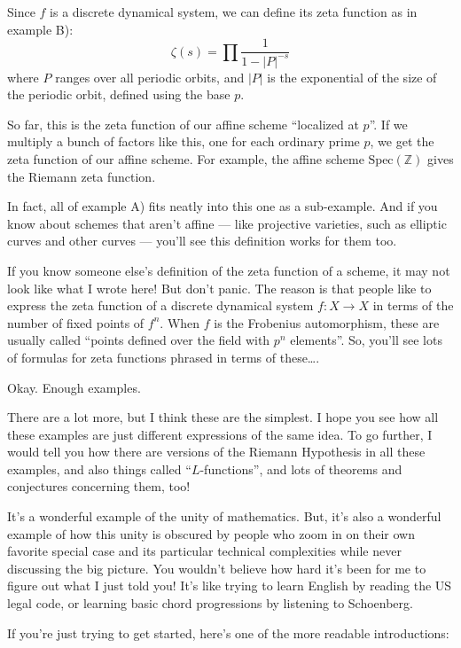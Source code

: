 \documentclass{article}
\def\tightlist{}
\renewcommand{\texttt}[1]{%
  \begingroup
  \ttfamily
  \begingroup\lccode`~=`/\lowercase{\endgroup\def~}{/\discretionary{}{}{}}%
  \begingroup\lccode`~=`[\lowercase{\endgroup\def~}{[\discretionary{}{}{}}%
  \begingroup\lccode`~=`.\lowercase{\endgroup\def~}{.\discretionary{}{}{}}%
  \catcode`/=\active\catcode`[=\active\catcode`.=\active
  \scantokens{#1\noexpand}%
  \endgroup
}
\begin{document}
Since \(f\) is a discrete dynamical system, we can define its zeta
function as in example B): \[\zeta(s) = \prod \frac{1}{1 - |P|^{-s}}\]
where \(P\) ranges over all periodic orbits, and \(|P|\) is the
exponential of the size of the periodic orbit, defined using the base
\(p\).

So far, this is the zeta function of our affine scheme ``localized at
\(p\)''. If we multiply a bunch of factors like this, one for each
ordinary prime \(p\), we get the zeta function of our affine scheme. For
example, the affine scheme \(\mathrm{Spec}(\mathbb{Z})\) gives the
Riemann zeta function.

In fact, all of example A) fits neatly into this one as a sub-example.
And if you know about schemes that aren't affine --- like projective
varieties, such as elliptic curves and other curves --- you'll see this
definition works for them too.

If you know someone else's definition of the zeta function of a scheme,
it may not look like what I wrote here! But don't panic. The reason is
that people like to express the zeta function of a discrete dynamical
system \(f\colon X \to X\) in terms of the number of fixed points of
\(f^n\). When \(f\) is the Frobenius automorphism, these are usually
called ``points defined over the field with \(p^n\) elements''. So,
you'll see lots of formulas for zeta functions phrased in terms of
these\ldots.

Okay. Enough examples.

There are a lot more, but I think these are the simplest. I hope you see
how all these examples are just different expressions of the same idea.
To go further, I would tell you how there are versions of the Riemann
Hypothesis in all these examples, and also things called
``\(L\)-functions'', and lots of theorems and conjectures concerning
them, too!

It's a wonderful example of the unity of mathematics. But, it's also a
wonderful example of how this unity is obscured by people who zoom in on
their own favorite special case and its particular technical
complexities while never discussing the big picture. You wouldn't
believe how hard it's been for me to figure out what I just told you!
It's like trying to learn English by reading the US legal code, or
learning basic chord progressions by listening to Schoenberg.

If you're just trying to get started, here's one of the more readable
introductions:

\end{document}
